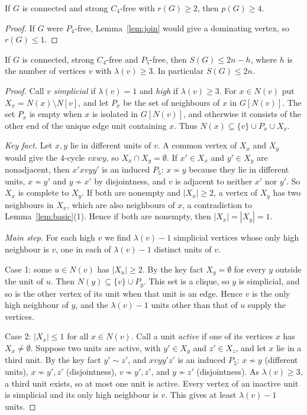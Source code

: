 \documentclass[ASNA]{USG}
\theoremstyle{WBstyletwo}
\numberwithin{equation}{section}
\newcommand{\pp}{p}
\begin{document}
\begin{lemma}\label{lem:r2}
If $G$ is connected and strong $C_4$-free with $r(G)\ge 2$, then $\pp(G)\ge 4$.
\end{lemma}

\begin{proof}
If $G$ were $P_4$-free, Lemma~\ref{lem:join} would give a dominating vertex, so $r(G)\le 1$.
\end{proof}

\begin{lemma}\label{lem:p5}
If $G$ is connected, strong $C_4$-free and $P_5$-free, then $S(G)\le 2n-h$, where $h$ is the number of vertices $v$ with $\lambda(v)\ge 3$. In particular $S(G)\le 2n$.
\end{lemma}

\begin{proof}
Call $v$ \emph{simplicial} if $\lambda(v)=1$ and \emph{high} if $\lambda(v)\ge 3$. For $x\in N(v)$ put $X_x=N(x)\setminus N[v]$, and let $P_x$ be the set of neighbours of $x$ in $G[N(v)]$. The set $P_x$ is empty when $x$ is isolated in $G[N(v)]$, and otherwise it consists of the other end of the unique edge unit containing $x$. Thus $N(x)\subseteq\{v\}\cup P_x\cup X_x$.

\emph{Key fact.} Let $x,y$ lie in different units of $v$. A common vertex of $X_x$ and $X_y$ would give the $4$-cycle $vxwy$, so $X_x\cap X_y=\emptyset$. If $x'\in X_x$ and $y'\in X_y$ are nonadjacent, then $x'xvyy'$ is an induced $P_5$: $x\nsim y$ because they lie in different units, $x\nsim y'$ and $y\nsim x'$ by disjointness, and $v$ is adjacent to neither $x'$ nor $y'$. So $X_x$ is complete to $X_y$. If both are nonempty and $|X_x|\ge 2$, a vertex of $X_y$ has two neighbours in $X_x$, which are also neighbours of $x$, a contradiction to Lemma~\ref{lem:basic}(1). Hence if both are nonempty, then $|X_x|=|X_y|=1$.

\emph{Main step.} For each high $v$ we find $\lambda(v)-1$ simplicial vertices whose only high neighbour is $v$, one in each of $\lambda(v)-1$ distinct units of $v$.

Case 1: some $u\in N(v)$ has $|X_u|\ge 2$. By the key fact $X_y=\emptyset$ for every $y$ outside the unit of $u$. Then $N(y)\subseteq\{v\}\cup P_y$. This set is a clique, so $y$ is simplicial, and so is the other vertex of its unit when that unit is an edge. Hence $v$ is the only high neighbour of $y$, and the $\lambda(v)-1$ units other than that of $u$ supply the vertices.

Case 2: $|X_x|\le 1$ for all $x\in N(v)$. Call a unit \emph{active} if one of its vertices $x$ has $X_x\ne\emptyset$. Suppose two units are active, with $y'\in X_y$ and $z'\in X_z$, and let $x$ lie in a third unit. By the key fact $y'\sim z'$, and $xvyy'z'$ is an induced $P_5$: $x\nsim y$ (different units), $x\nsim y',z'$ (disjointness), $v\nsim y',z'$, and $y\nsim z'$ (disjointness). As $\lambda(v)\ge 3$, a third unit exists, so at most one unit is active. Every vertex of an inactive unit is simplicial and its only high neighbour is $v$. This gives at least $\lambda(v)-1$ units.


\end{proof}
\end{document}
